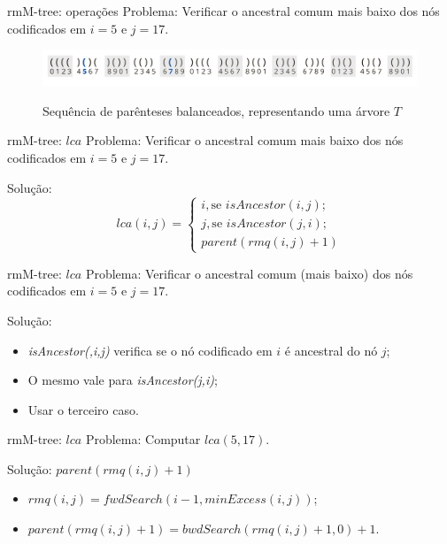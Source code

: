 \begin{frame}{rmM-tree: operações}
    Problema: Verificar o ancestral comum mais baixo dos nós codificados em $i=5$ e $j=17$.
     \begin{figure}[h!]
         \centering
         \includegraphics[scale=0.7]{images/bp-sequence.png}\\
         \caption{Sequência de parênteses balanceados, representando uma árvore $T$}
     \end{figure} 
 
 \end{frame}

 \begin{frame}{rmM-tree: $lca$}
    Problema: Verificar o ancestral comum mais baixo dos nós codificados em $i=5$ e $j=17$.

    Solução: 
    $$lca(i,j) = 
    \begin{cases}
          i,  \mbox{se } isAncestor(i,j); \\
         j, \mbox{se } isAncestor(j,i); \\
         parent(rmq(i ,j)+1)
    \end{cases}
    $$ 
 \end{frame}

 \begin{frame}{rmM-tree: $lca$}
    Problema: Verificar o ancestral comum (mais baixo) dos nós codificados em $i=5$ e $j=17$.


    Solução:\\
    \begin{itemize}
        \item \textit{isAncestor(,i,j)} verifica se o nó codificado em $i$ é ancestral do nó $j$;
        \item O mesmo vale para \textit{isAncestor(j,i)};
        \item Usar o terceiro caso.
    \end{itemize}
 \end{frame}


 \begin{frame}{rmM-tree: $lca$}
    Problema: Computar $lca(5,17)$.


    Solução: $ parent(rmq(i ,j)+1)$\\
    \begin{itemize}
        \item $rmq(i,j) = fwdSearch(i-1, minExcess(i,j))$;
        \item $parent(rmq(i,j)+1) = bwdSearch(rmq(i,j)+1, 0) + 1$.
    \end{itemize}
 \end{frame}


